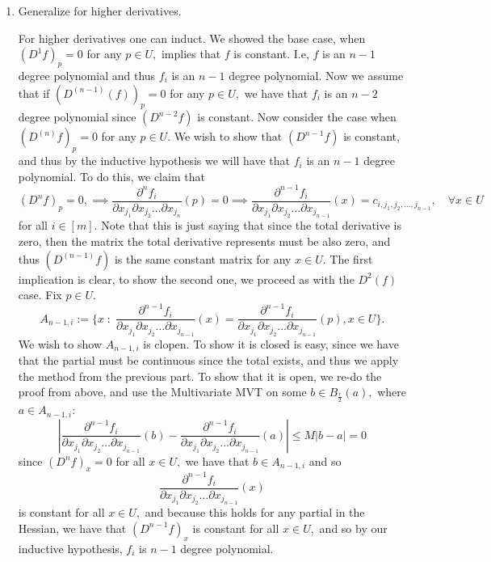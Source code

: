 \documentclass[11pt]{article}
\begin{document}
\begin{enumerate}
\item 
\begin{problem}
    Generalize for higher derivatives.
\end{problem}
\begin{solution}
For higher derivatives one can induct. We showed the base case, when $(D^{1}f)_p = 0$ for any $p \in U,$ implies that $f$ is constant. I.e, $f$ is an $n-1$ degree polynomial and thus $f_i$ is an $n-1$ degree polynomial. Now we assume that if $(D^{(n-1)}(f))_p = 0$ for any $p \in U,$ we have that $f_i$ is an $n-2$ degree polynomial since $(D^{n-2}f)$ is constant. Now consider the case when $(D^{(n)}f)_p = 0$ for any $p \in U.$ We wish to show that $(D^{n-1}f)$ is constant, and thus by the inductive hypothesis we will have that $f_i$ is an $n-1$ degree polynomial. To do this, we claim that 
\[(D^{n}f)_p = 0, \implies \frac{\partial^{n} f_{i}}{\partial x_{j_1} \partial x_{j_2} \dots \partial x_{j_n}}(p) = 0 \implies \frac{\partial^{n-1} f_{i}}{\partial x_{j_1} \partial x_{j_2} \dots \partial x_{j_{n-1}}}(x) = c_{i,j_1, j_2, \dots, j_{n-1}}, \quad \forall x \in U\] for all $i \in [m].$ Note that this is just saying that since the total derivative is zero, then the matrix the total derivative represents must be also zero, and thus $(D^{(n-1)}f)$ is the same constant matrix for any $x \in U.$ The first implication is clear, to show the second one, we proceed as with the $D^{2}(f)$ case. Fix $p\in U.$
\[A_{{n-1}, i} := \{x \; : \; \frac{\partial^{n-1} f_{i}}{\partial x_{j_1} \partial x_{j_2} \dots \partial x_{j_{n-1}}}(x) = \frac{\partial^{n-1} f_{i}}{\partial x_{j_1} \partial x_{j_2} \dots \partial x_{j_{n-1}}}(p), x\in U\}.\] We wish to show $A_{n-1, i}$ is clopen. To show it is closed is easy, since we have that the partial must be continuous since the total exists, and thus we apply the method from the previous part. To show that it is open, we re-do the proof from above, and use the Multivariate MVT on some $b \in B_{\frac{r}{2}}(a),$ where $a \in A_{n-1, i}:$
\[|\frac{\partial^{n-1} f_{i}}{\partial x_{j_1} \partial x_{j_2} \dots \partial x_{j_{n-1}}}(b) - \frac{\partial^{n-1} f_{i}}{\partial x_{j_1} \partial x_{j_2} \dots \partial x_{j_{n-1}}}(a)| \leq M|b-a| = 0\] since $(D^{n}f)_x = 0$ for all $x \in U,$ we have that $b\in A_{n-1, i}$ and so \[\frac{\partial^{n-1} f_{i}}{\partial x_{j_1} \partial x_{j_2} \dots \partial x_{j_{n-1}}}(x)\] is constant for all $x \in U,$ and because this holds for any partial in the Hessian, we have that $(D^{n-1}f)_x$ is constant for all $x\in U,$ and so by our inductive hypothesis, $f_i$ is $n-1$ degree polynomial.
\end{solution}
\end{enumerate}
\newpage
\end{document}
